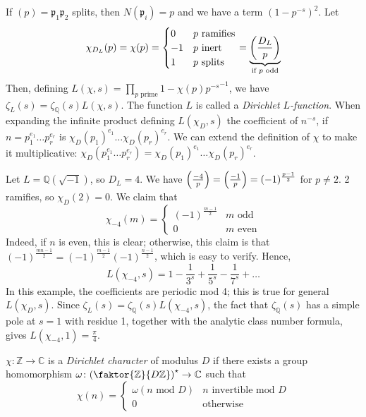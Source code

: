 If \( (p) = \mathfrak p_1 \mathfrak p_2 \) splits, then \( N(\mathfrak p_i) = p \) and we have a term \( (1 - p^{-s})^2 \).
Let
\[ \chi_{D_L}(p) = \chi(p) = \begin{cases}
    0 & p \text{ ramifies} \\
    -1 & p \text{ inert} \\
    1 & p \text{ splits}
\end{cases} = \underbrace{\qty(\frac{D_L}{p})}_{\mathclap{\text{if } p \text{ odd}}} \]
Then, defining \( L(\chi,s) = \prod_{p \text{ prime}} {1 - \chi(p) p^{-s}}^{-1} \), we have \( \zeta_L(s) = \zeta_{\mathbb Q}(s) L(\chi,s) \).
The function \( L \) is called a \emph{Dirichlet \( L \)-function}.
When expanding the infinite product defining \( L(\chi_D, s) \) the coefficient of \( n^{-s} \), if \( n = p_1^{e_1} \dots p_r^{e_r} \) is \( \chi_D(p_1)^{e_1} \dots \chi_D(p_r)^{e_r} \).
We can extend the definition of \( \chi \) to make it multiplicative: \( \chi_D(p_1^{e_1} \dots p_r^{e_r}) = \chi_D(p_1)^{e_1} \dots \chi_D(p_r)^{e_r} \).
\begin{example}
    Let \( L = \mathbb Q(\sqrt{-1}) \), so \( D_L = 4 \).
    We have \( \qty(\frac{-4}{p}) = \qty(\frac{-1}{p}) = (-1)^{\frac{p-1}{2}} \) for \( p \neq 2 \).
    2 ramifies, so \( \chi_D(2) = 0 \).
    We claim that
    \[ \chi_{-4}(m) = \begin{cases}
        (-1)^{\frac{m-1}{2}} & m \text{ odd} \\
        0 & m \text{ even}
    \end{cases} \]
    Indeed, if \( n \) is even, this is clear; otherwise, this claim is that \( (-1)^{\frac{mn-1}{2}} = (-1)^{\frac{m-1}{2}} (-1)^{\frac{n-1}{2}} \), which is easy to verify.
    Hence,
    \[ L(\chi_{-4}, s) = 1 - \frac{1}{3^s} + \frac{1}{5^s} - \frac{1}{7^s} + \dots \]
    In this example, the coefficients are periodic mod 4; this is true for general \( L(\chi_D, s) \).
    Since \( \zeta_L(s) = \zeta_{\mathbb Q}(s) L(\chi_{-4}, s) \), the fact that \( \zeta_{\mathbb Q}(s) \) has a simple pole at \( s = 1 \) with residue 1, together with the analytic class number formula, gives \( L(\chi_{-4}, 1) = \frac{\pi}{4} \).
\end{example}
\begin{definition}
    \( \chi \colon \mathbb Z \to \mathbb C \) is a \emph{Dirichlet character} of modulus \( D \) if there exists a group homomorphism \( \omega \colon \qty(\faktor{\mathbb Z}{D\mathbb Z})^\star \to \mathbb C \) such that
    \[ \chi(n) = \begin{cases}
        \omega(n \text{ mod } D) & n \text{ invertible mod } D \\
        0 & \text{otherwise}
    \end{cases} \]
\end{definition}
